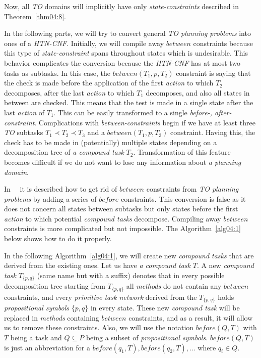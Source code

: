 \medskip\noindent
Now, all \emph{TO} domains will implicitly have only \emph{state-constraints} described in Theorem~\ref{thm04:8}.

\medskip\noindent
In the following parts, we will try to convert general \emph{TO planning problems} into ones of a \emph{HTN-CNF}. Initially, we will compile away $between$ constraints because this type of \emph{state-constraint} spans throughout states which is undesirable. This behavior complicates the conversion because the \emph{HTN-CNF} has at most two tasks as subtasks. In this case, the $between(T_1, p, T_2)$ constraint is saying that the check is made before the application of the first \emph{action} to which $T_2$ decomposes, after the last \emph{action} to which $T_1$ decomposes, and also all states in between are checked. This means that the test is made in a single state after the last \emph{action} of $T_1$. This can be easily transformed to a single \emph{before-, after-constraint}. Complications with \emph{between-constraints} begin if we have at least three \emph{TO} subtasks $T_1 \prec T_2 \prec T_3$ and a $between(T_1, p, T_3)$ constraint. Having this, the check has to be made in (potentially) multiple states depending on a decomposition tree of \emph{a compound task} $T_2$. Transformation of this feature becomes difficult if we do not want to lose any information about \emph{a planning domain}.

\medskip\noindent
In~\cite{ondrckova2023semantics}~\cite{ondrckova2024empty} it is described how to get rid of $between$ constraints from \emph{TO planning problems} by adding a series of $before$ constraints. This conversion is false as it does not concern all states between subtasks but only states before the first \emph{action} to which potential \emph{compound tasks} decompose. Compiling away $between$ constraints is more complicated but not impossible. The Algorithm~\ref{alg04:1} below shows how to do it properly.

\medskip\noindent
In the following Algorithm~\ref{alg04:1}, we will create new \emph{compound tasks} that are derived from the existing ones. Let us have \emph{a compound task} $T$. A new \emph{compound task} $T_{\{p, q\}}$ (same name but with a suffix) denotes that in every possible decomposition tree starting from $T_{\{p, q\}}$ all \emph{methods} do not contain any $between$ constraints, and every \emph{primitive task network} derived from the $T_{\{p, q\}}$ holds \emph{propositional symbols} $\{p, q\}$ in every state. These new \emph{compound task} will be replaced in \emph{methods} containing $between$ constraints, and as a result, it will allow us to remove these constraints. Also, we will use the notation $before(Q, T)$ with $T$ being a task and $Q \subseteq P$ being a subset of \emph{propositional symbols}. $before(Q, T)$ is just an abbreviation for a $before(q_1, T), before(q_2, T), \dots$ where $q_i \in Q$.

